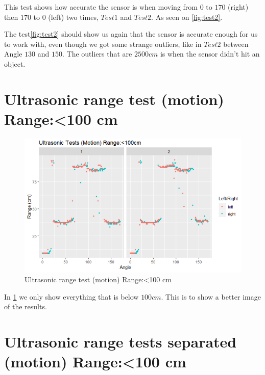 This test shows how accurate the sensor is when moving from $0$ to $170$ (right) then $170$ to $0$ (left) two times, $Test 1$ and $Test 2$. As seen on \ref{fig:test2}.

The test\ref{fig:test2} should show us again that the sensor is accurate enough for us to work with, even though we got some strange outliers, like in $Test 2$ between Angle $130$ and $150$. The outliers that are $2500 cm$ is when the sensor didn't hit an object. 

\newpage

\section{Ultrasonic range test (motion) Range:<100 cm} 

\begin{figure} [h!]
  \includegraphics[width=\linewidth]{fig/test3}
  \caption{Ultrasonic range test (motion) Range:<100 cm}
  \label{fig:test3}
\end{figure}

In \ref{fig:test3} we only show everything that is below $100 cm$. This is to show a better image of the results.

\newpage

\section{Ultrasonic range tests separated (motion) Range:<100 cm} 

